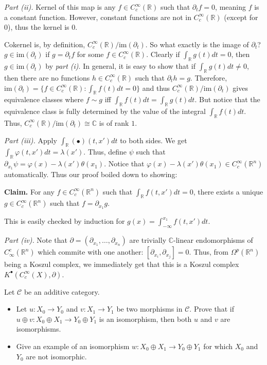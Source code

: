 \documentclass{category-template}
\begin{document}
\textit{Part (ii).} Kernel of this map is any $f \in C_c^{\infty}(\mathbb{R})$
such that $\partial_t f = 0$, meaning $f$ is a constant function. However,
constant functions are not in $C_c^{\infty}(\mathbb{R})$ (except for $0$), thus
the kernel is $0$.

Cokernel is, by definition, $C_c^{\infty}(\mathbb{R})/\text{im}(\partial_t)$. So
what exactly is the image of $\partial_t$? $g \in \text{im}(\partial_t)$ if
$g=\partial_t f$ for some $f \in C_c^{\infty}(\mathbb{R})$. Clearly if
$\int_{\mathbb{R}}g(t)dt=0$, then $g \in \text{im}(\partial_t)$ by \textit{part
(i)}. In general, it is easy to show that if $\int_{\mathbb{R}}g(t)dt \neq 0$,
then there are no functions $h \in C_c^{\infty}(\mathbb{R})$ such that
$\partial_t h = g$. Therefore, $\text{im}(\partial_t) = \{f \in
C_c^{\infty}(\mathbb{R}): \int_{\mathbb{R}}f(t)dt=0\}$ and thus
$C_c^{\infty}(\mathbb{R})/\text{im}(\partial_t)$ gives equivalence classes where
$f \sim g$ iff $\int_{\mathbb{R}}f(t)dt=\int_{\mathbb{R}}g(t)dt$. But notice
that the equivalence class is fully determined by the value of the integral
$\int_{\mathbb{R}}f(t)dt$. Thus, $C_c^{\infty}(\mathbb{R})/\text{im}(\partial_t)
\cong \mathbb{C}$ is of rank $1$.

\textit{Part (iii).} Apply $\int_{\mathbb{R}}(\bullet)(t,x')dt$ to both sides.
We get $\int_{\mathbb{R}}\varphi(t,x')dt = \lambda(x')$. Thus, define $\psi$
such that $\partial_{x_1}\psi = \varphi(x) - \lambda(x')\theta(x_1)$. Notice
that $\varphi(x) - \lambda(x')\theta(x_1) \in C_c^{\infty}(\mathbb{R}^n)$
automatically. Thus our proof boiled down to showing:

\textbf{Claim.} For any $f \in C_c^{\infty}(\mathbb{R}^n)$ such that
$\int_{\mathbb{R}}f(t,x')dt=0$, there exists a unique $g \in
C_c^{\infty}(\mathbb{R}^n)$ such that $f=\partial_{x_1}g$.

This is easily checked by induction for $g(x) = \int_{-\infty}^{x_1}f(t,x')dt$.

\textit{Part (iv).} Note that $\partial=(\partial_{x_1},\dots,\partial_{x_n})$
are trivially $\mathbb{C}$-linear endomorphisms of $C_{\infty}^c(\mathbb{R}^n)$
which commite with one another: $[\partial_{x_i},\partial_{x_j}] = 0$. Thus,
from $\Omega^p(\mathbb{R}^n)$ being a Koszul complex, we immediately get that
this is a Koszul complex $K^{\bullet}(C_c^{\infty}(X), \partial)$.

\begin{problem}
    Let $\mathcal{C}$ be an additive category.
    \begin{itemize}
        \item[(i)] Let $u: X_0 \to Y_0$ and $v: X_1 \to Y_1$ be two morphisms 
        in $\mathcal{C}$. Prove that if $u \oplus v: X_0 \oplus X_1 \to Y_0 \oplus Y_1$
        is an isomorphism, then both $u$ and $v$ are isomorphisms.
        \item[(ii)] Give an example of an isomorphism $w: X_0 \oplus X_1 \to Y_0 \oplus Y_1$
        for which $X_0$ and $Y_0$ are not isomorphic.
    \end{itemize}
\end{problem}
\end{document}
